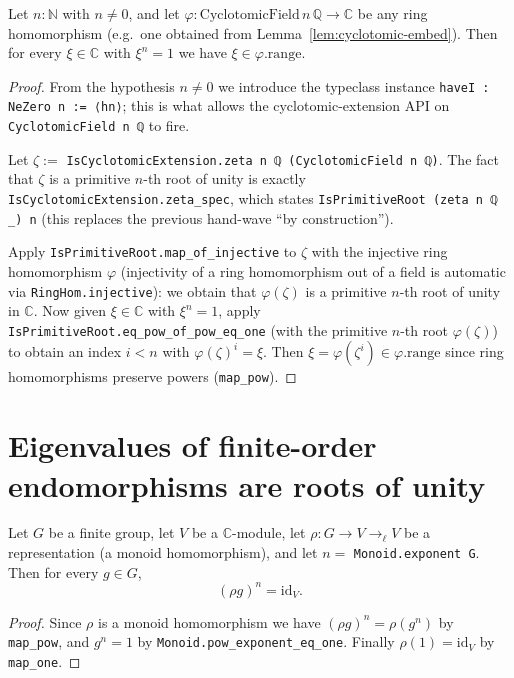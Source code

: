 \begin{lemma}
  \label{lem:phi-range-roots-of-unity}
  \leanok
  Let $n : \mathbb{N}$ with $n \neq 0$, and let $\varphi : \mathrm{CyclotomicField}\,n\,\mathbb{Q} \to \mathbb{C}$ be any ring homomorphism (e.g.\ one obtained from Lemma~\ref{lem:cyclotomic-embed}).  Then for every $\xi \in \mathbb{C}$ with $\xi^n = 1$ we have $\xi \in \varphi.\mathrm{range}$.
\end{lemma}
\begin{proof}
  From the hypothesis $n \neq 0$ we introduce the typeclass instance \verb|haveI : NeZero n := ⟨hn⟩|; this is what allows the cyclotomic-extension API on \verb|CyclotomicField n ℚ| to fire.

  Let $\zeta := $ \verb|IsCyclotomicExtension.zeta n ℚ (CyclotomicField n ℚ)|.  The fact that $\zeta$ is a primitive $n$-th root of unity is exactly \verb|IsCyclotomicExtension.zeta_spec|, which states \verb|IsPrimitiveRoot (zeta n ℚ _) n| (this replaces the previous hand-wave ``by construction'').

  Apply \verb|IsPrimitiveRoot.map_of_injective| to $\zeta$ with the injective ring homomorphism $\varphi$ (injectivity of a ring homomorphism out of a field is automatic via \verb|RingHom.injective|): we obtain that $\varphi(\zeta)$ is a primitive $n$-th root of unity in $\mathbb{C}$.  Now given $\xi \in \mathbb{C}$ with $\xi^n = 1$, apply \verb|IsPrimitiveRoot.eq_pow_of_pow_eq_one| (with the primitive $n$-th root $\varphi(\zeta)$) to obtain an index $i < n$ with $\varphi(\zeta)^i = \xi$.  Then $\xi = \varphi(\zeta^i) \in \varphi.\mathrm{range}$ since ring homomorphisms preserve powers (\verb|map_pow|).
\end{proof}

\section{Eigenvalues of finite-order endomorphisms are roots of unity}

\begin{lemma}
  \label{lem:rep-pow-exponent}
  \leanok
  Let $G$ be a finite group, let $V$ be a $\mathbb{C}$-module, let $\rho : G \to V \to_{\ell} V$ be a representation (a monoid homomorphism), and let $n = $ \verb|Monoid.exponent G|.  Then for every $g \in G$,
  \[
    (\rho g)^n = \mathrm{id}_V.
  \]
\end{lemma}
\begin{proof}
  Since $\rho$ is a monoid homomorphism we have $(\rho g)^n = \rho(g^n)$ by \verb|map_pow|, and $g^n = 1$ by \verb|Monoid.pow_exponent_eq_one|.  Finally $\rho(1) = \mathrm{id}_V$ by \verb|map_one|.
\end{proof}

